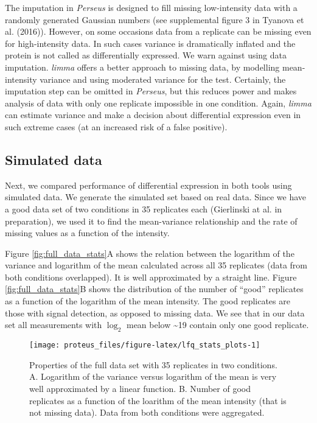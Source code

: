 \documentclass[]{article}
\begin{document}
The imputation in \emph{Perseus} is designed to fill missing
low-intensity data with a randomly generated Gaussian numbers (see
supplemental figure 3 in Tyanova et al. (2016)). However, on some
occasions data from a replicate can be missing even for high-intensity
data. In such cases variance is dramatically inflated and the protein is
not called as differentially expressed. We warn against using data
imputation. \emph{limma} offers a better approach to missing data, by
modelling mean-intensity variance and using moderated variance for the
test. Certainly, the imputation step can be omitted in \emph{Perseus},
but this reduces power and makes analysis of data with only one
replicate impossible in one condition. Again, \emph{limma} can estimate
variance and make a decision about differential expression even in such
extreme cases (at an increased risk of a false positive).

\subsection{Simulated data}\label{simulated-data}

Next, we compared performance of differential expression in both tools
using simulated data. We generate the simulated set based on real data.
Since we have a good data set of two conditions in 35 replicates each
(Gierlinski at al. in preparation), we used it to find the mean-variance
relationship and the rate of missing values as a function of the
intensity.

Figure \ref{fig:full_data_stats}A shows the relation between the
logarithm of the variance and logarithm of the mean calculated across
all 35 replicates (data from both conditions overlapped). It is well
approximated by a straight line. Figure \ref{fig:full_data_stats}B shows
the distribution of the number of ``good'' replicates as a function of
the logarithm of the mean intensity. The good replicates are those with
signal detection, as opposed to missing data. We see that in our data
set all measurements with \(\log_2\) mean below \textasciitilde{}19
contain only one good replicate.

\begin{figure}[H]

{\centering \texttt{[image: proteus\_files/figure-latex/lfq\_stats\_plots-1]} 

}

\caption{\label{fig:full_data_stats}Properties of the full data set with 35 replicates in two conditions. A. Logarithm of the variance versus logarithm of the mean is very well approximated by a linear function. B. Number of good replicates as a function of the loarithm of the mean intensity (that is not missing data). Data from both conditions were aggregated.}\label{fig:lfq_stats_plots}
\end{figure}
\end{document}
